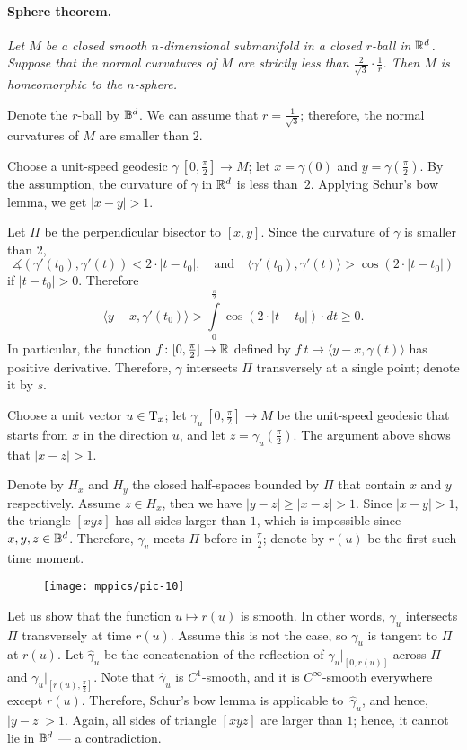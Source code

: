 \documentclass[a4paper,10pt]{article}
\begin{document}
\paragraph{Sphere theorem.}
\label{thm:strict}
\textit{Let $M$ be a closed smooth $n$-dimensional submanifold in a closed $r$-ball in $\mathbb{R}^d$.
Suppose that the normal curvatures of $M$ are strictly less than $\tfrac2{\sqrt{3}}\cdot\tfrac1r$.
Then $M$ is homeomorphic to the $n$-sphere.}


Denote the $r$-ball by $\mathbb{B}^d$.
We can assume that $r=\tfrac1{\sqrt{3}}$;
therefore, the normal curvatures of $M$ are smaller than $2$.

Choose a unit-speed geodesic $\gamma\:[0,\tfrac\pi2]\to M$;
let $x=\gamma(0)$ and $y=\gamma(\tfrac\pi2)$.
By the assumption, the curvature of $\gamma$ in $\mathbb{R}^d$ is less than~$2$.
Applying Schur's bow lemma, we get $|x-y|>1$.

Let $\Pi$ be the perpendicular bisector to $[x,y]$.
Since the curvature of $\gamma$ is smaller than 2,
\[\measuredangle(\gamma'(t_0),\gamma'(t))< 2\cdot|t-t_0|,
\quad\text{and}\quad
\langle \gamma'(t_0),\gamma'(t) \rangle> \cos (2\cdot|t-t_0|)\] if $|t-t_0|>0$.
Therefore
\[\langle y-x,\gamma'(t_0) \rangle>\int\limits_0^{\frac\pi2}\cos (2\cdot |t-t_0|)\cdot dt\ge0.\]
In particular, the function $f\colon[0,\tfrac\pi2]\to\mathbb{R}$ defined by
$f\:t\mapsto \langle y-x,\gamma(t) \rangle$
has positive derivative.
Therefore, $\gamma$ intersects $\Pi$ transversely at a single point;
denote it by $s$.



Choose a unit vector $u\in\mathrm{T}_x$;
let $\gamma_u\:[0,\tfrac\pi2]\to M$ be the unit-speed geodesic that starts from $x$ in the direction $u$, and let $z=\gamma_u(\tfrac\pi2)$.
The argument above shows that $|x-z|>1$.

Denote by $H_x$ and $H_y$ the closed half-spaces bounded by $\Pi$ that contain $x$ and $y$ respectively.
Assume $z\in H_x$, then we have $|y-z|\ge |x-z|>1$.
Since $|x-y|>1$, the triangle $[xyz]$ has all sides larger than $1$,
which is impossible since $x,y,z\in \mathbb{B}^d$.
Therefore, $\gamma_v$ meets $\Pi$ before in $\tfrac\pi2$;
denote by $r(u)$ be the first such time moment.

\begin{wrapfigure}{r}{44 mm}
\vskip-0mm
\centering
\texttt{[image: mppics/pic-10]}
\vskip2mm
\end{wrapfigure}

Let us show that the function $u\mapsto r(u)$ is smooth.
In other words, $\gamma_u$ intersects $\Pi$ transversely at time $r(u)$.
Assume this is not the case, so $\gamma_u$ is tangent to $\Pi$ at $r(u)$.
Let $\hat\gamma_u$ be the concatenation of the reflection of $\gamma_u|_{[0,r(u)]}$ across $\Pi$ and $\gamma_u|_{[r(u),\frac\pi2]}$.
Note that $\hat \gamma_u$ is $C^1$-smooth, and it is $C^\infty$-smooth everywhere except $r(u)$.
Therefore, Schur's bow lemma is applicable to~$\hat \gamma_u$, and hence, $|y-z|>1$.
Again, all sides of triangle $[xyz]$ are larger than $1$;
hence, it cannot lie in $\mathbb{B}^d$ --- a contradiction.  
\end{document}
